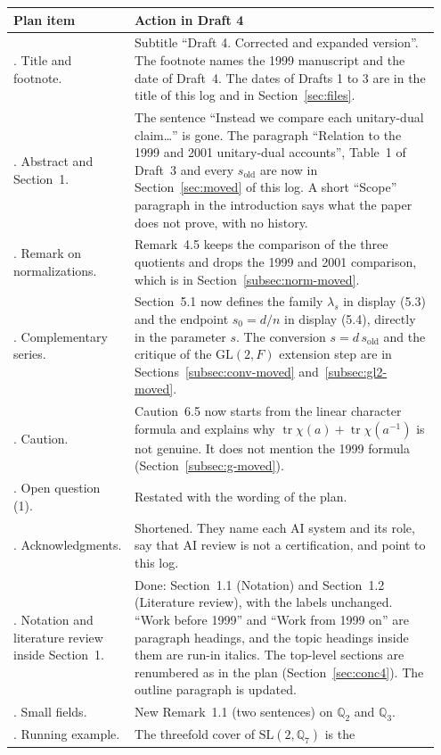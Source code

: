 \documentclass[12pt,letterpaper]{article}
\newcommand{\Qq}{\mathbb Q}
\newcommand{\SL}{\mathrm{SL}}
\newcommand{\GL}{\mathrm{GL}}
\DeclareMathOperator{\tr}{tr}
\begin{document}
\begin{longtable}{@{}>{\raggedright\arraybackslash}p{0.27\linewidth}>{\raggedright\arraybackslash}p{0.68\linewidth}@{}}
\toprule
Plan item & Action in Draft 4\\
\midrule
\endhead
1. Title and footnote. & Subtitle ``Draft 4. Corrected and expanded
version''. The footnote names the 1999 manuscript and the date of
Draft~4. The dates of Drafts 1 to 3 are in the title of this log and in
Section~\ref{sec:files}.\\
1. Abstract and Section~1. & The sentence ``Instead we compare each
unitary-dual claim\dots'' is gone. The paragraph ``Relation to the 1999
and 2001 unitary-dual accounts'', Table~1 of Draft~3 and every
$s_{\mathrm{old}}$ are now in Section~\ref{sec:moved} of this log. A
short ``Scope'' paragraph in the introduction says what the paper does
not prove, with no history.\\
1. Remark on normalizations. & Remark~4.5 keeps the comparison of the
three quotients and drops the 1999 and 2001 comparison, which is in
Section~\ref{subsec:norm-moved}.\\
1. Complementary series. & Section~5.1 now defines the family
$\lambda_s$ in display (5.3) and the endpoint $s_0=d/n$ in display (5.4),
directly in the parameter $s$. The conversion $s=d\,s_{\mathrm{old}}$
and the critique of the $\GL(2,F)$ extension step are in
Sections~\ref{subsec:conv-moved} and~\ref{subsec:gl2-moved}.\\
1. Caution. & Caution~6.5 now starts from the linear character formula and
explains why $\tr\chi(a)+\tr\chi(a^{-1})$ is not genuine. It does not
mention the 1999 formula (Section~\ref{subsec:g-moved}).\\
1. Open question (1). & Restated with the wording of the plan.\\
1. Acknowledgments. & Shortened. They name each AI system and its role,
say that AI review is not a certification, and point to this log.\\
2. Notation and literature review inside Section~1. & Done:
Section~1.1 (Notation) and Section~1.2 (Literature review), with the
labels unchanged. ``Work before 1999'' and ``Work from 1999 on'' are
paragraph headings, and the topic headings inside them are run-in
italics. The top-level sections are renumbered as in the plan
(Section~\ref{sec:conc4}). The outline paragraph is updated.\\
3. Small fields. & New Remark~1.1 (two sentences) on $\Qq_2$ and
$\Qq_3$.\\
3. Running example. & The threefold cover of $\SL(2,\Qq_7)$ is the

\end{longtable}
\end{document}
